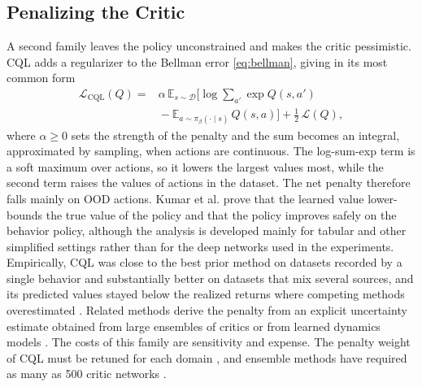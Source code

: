 \documentclass[journal]{IEEEtran}
\begin{document}
\subsection{Penalizing the Critic}
A second family leaves the policy unconstrained and makes the critic pessimistic. CQL \cite{kumar2020cql} adds a regularizer to the Bellman error \eqref{eq:bellman}, giving in its most common form
\begin{align}
\mathcal{L}_{\mathrm{CQL}}(Q) ={}& \alpha\, \mathbb{E}_{s \sim \mathcal{D}}\Big[\log \sum_{a'} \exp Q(s,a') \nonumber\\
& {}- \mathbb{E}_{a \sim \pi_\beta(\cdot \mid s)}\, Q(s,a)\Big] + \tfrac{1}{2}\,\mathcal{L}(Q),
\label{eq:cql}
\end{align}
where $\alpha \geq 0$ sets the strength of the penalty and the sum becomes an integral, approximated by sampling, when actions are continuous. The log-sum-exp term is a soft maximum over actions, so it lowers the largest values most, while the second term raises the values of actions in the dataset. The net penalty therefore falls mainly on OOD actions. Kumar et al. prove that the learned value lower-bounds the true value of the policy and that the policy improves safely on the behavior policy, although the analysis is developed mainly for tabular and other simplified settings rather than for the deep networks used in the experiments. Empirically, CQL was close to the best prior method on datasets recorded by a single behavior and substantially better on datasets that mix several sources, and its predicted values stayed below the realized returns where competing methods overestimated \cite{kumar2020cql}. Related methods derive the penalty from an explicit uncertainty estimate obtained from large ensembles of critics \cite{an2021edac} or from learned dynamics models \cite{yu2020mopo}. The costs of this family are sensitivity and expense. The penalty weight of CQL must be retuned for each domain \cite{kumar2020cql}, and ensemble methods have required as many as 500 critic networks \cite{an2021edac,tarasov2023rebrac}.
\end{document}
